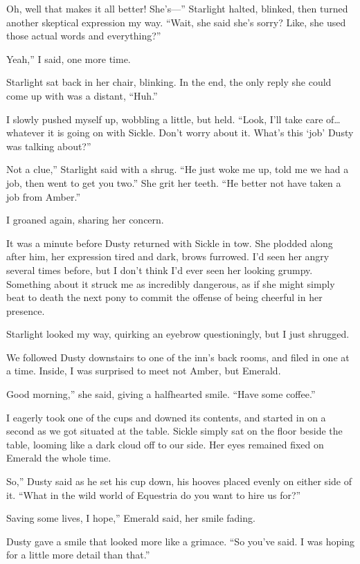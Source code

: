 \leavevmode{}Oh, well that makes it all better! She’s—” Starlight halted, blinked, then turned another skeptical expression my way. “Wait, she said she’s sorry? Like, she used those actual words and everything?”

\leavevmode{}Yeah,” I said, one more time.

Starlight sat back in her chair, blinking. In the end, the only reply she could come up with was a distant, “Huh.”

I slowly pushed myself up, wobbling a little, but held. “Look, I’ll take care of… whatever it is going on with Sickle. Don’t worry about it. What’s this ‘job’ Dusty was talking about?”

\leavevmode{}Not a clue,” Starlight said with a shrug. “He just woke me up, told me we had a job, then went to get you two.” She grit her teeth. “He better not have taken a job from Amber.”

I groaned again, sharing her concern.

It was a minute before Dusty returned with Sickle in tow. She plodded along after him, her expression tired and dark, brows furrowed. I’d seen her angry several times before, but I don’t think I’d ever seen her looking grumpy. Something about it struck me as incredibly dangerous, as if she might simply beat to death the next pony to commit the offense of being cheerful in her presence.

Starlight looked my way, quirking an eyebrow questioningly, but I just shrugged.

We followed Dusty downstairs to one of the inn’s back rooms, and filed in one at a time. Inside, I was surprised to meet not Amber, but Emerald.

\leavevmode{}Good morning,” she said, giving a halfhearted smile. “Have some coffee.”

I eagerly took one of the cups and downed its contents, and started in on a second as we got situated at the table. Sickle simply sat on the floor beside the table, looming like a dark cloud off to our side. Her eyes remained fixed on Emerald the whole time.

\leavevmode{}So,” Dusty said as he set his cup down, his hooves placed evenly on either side of it. “What in the wild world of Equestria do you want to hire us for?”

\leavevmode{}Saving some lives, I hope,” Emerald said, her smile fading.

Dusty gave a smile that looked more like a grimace. “So you’ve said. I was hoping for a little more detail than that.”

